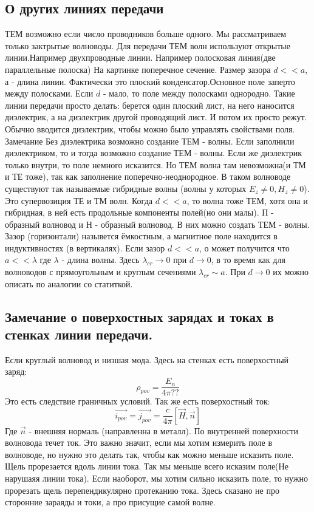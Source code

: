 \subsection{О других линиях передачи}

ТЕМ возможно если число проводников больше одного. Мы рассматриваем только зактрытые волноводы.
%
Для передачи ТЕМ волн используют открытые линии.Например двухпроводные линии.
%
Например полосковая линия(две параллельные полоска)
На картинке поперечное сечение.
%
Размер зазора $d<< a$, а - длина линии. Фактически это плоский конденсатор.Основное поле заперто между полосками.
%
Если $d$ - мало, то поле между полосками однородно.
%
Такие линии передачи просто делать: берется один плоский лист, на него наносится диэлектрик, а на диэлектрик другой проводящий лист. И потом их просто режут.
%
Обычно вводится диэлектрик, чтобы можно было управлять свойствами поля.
%
Замечание
%
Без диэлектрика возможно создание ТЕМ - волны. Если заполнили диэлектриком, то и тогда возможно создание ТЕМ - волны.  
%
Если же диэлектрик только внутри, то поле немного исказится. Но ТЕМ волна там невозможна(и ТМ и ТЕ тоже), так как заполнение поперечно-неоднородное.
%
В таком волноводе существуют так называемые гибридные волны (волны у которых $E_z \neq 0, H_z \neq 0$). Это супервозиция ТЕ и ТМ волн.
%
Когда $d<<a$, то волна тоже ТЕМ, хотя она и гибридная, в ней есть продольные компоненты полей(но они малы).
%
П - образный волновод и Н - образный волновод.
%
В них можно создать ТЕМ - волны.
%
Зазор (горизонтали) назывется ёмкостным, а магнитное поле находится в индуктивностях (в вертикалях).
%
Если зазор $d <<a$, о может получится что $a << \lambda$ где $\lambda$ - длина волны. Здесь $\lambda_{cr} \rightarrow 0$ при $d \rightarrow 0$, в то время как для волноводов с прямоугольным и круглым сечениями  $\lambda_{cr} \sim a$.
%
При $d \rightarrow 0$ их можно описать по аналогии со статиткой.
%
\subsection{Замечание о поверхостных зарядах и токах в стенках линии передачи.}
%
Если круглый волновод и низшая мода.
%
Здесь на стенках есть поверхостный заряд:
\begin{equation}
	\rho_{pov} = \frac{E_n}{4 \pi ??}
\end{equation}
Это есть следствие граничных условий.
Так же есть поверхостный ток:
\begin{equation}
	\vec{i_{pov}} = \vec{j_{pov}} = \frac{c}{4 \pi} [\vec{H}, \vec{n}]
\end{equation}
Где $\vec{n}$ - внешняя нормаль (направленна в металл).
%
По внутренней поверхности волновода течет ток. Это важно значит, если мы хотим измерить поле в волноводе, но нужно это делать так, чтобы как можно меньше исказить поле.
%
Щель прорезается вдоль линии тока. Так мы меньше всего исказим поле(Не нарушаяя линии тока).
%
Если наоборот, мы хотим сильно исказить поле, то нужно прорезать щель перепендикулярно протеканию тока.
%
Здесь сказано не про сторонние зараяды и токи, а про присущие самой волне.
%
